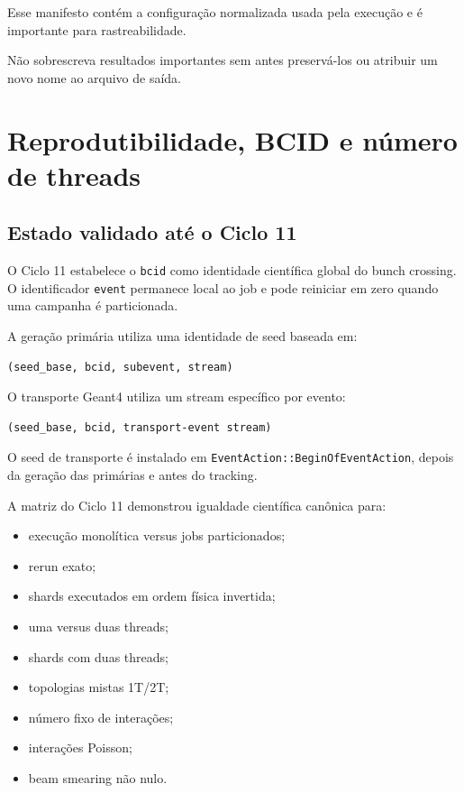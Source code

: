 \documentclass[11pt,a4paper]{article}
\begin{document}
Esse manifesto contém a configuração normalizada usada pela execução e é
importante para rastreabilidade.

Não sobrescreva resultados importantes sem antes preservá-los ou atribuir um
novo nome ao arquivo de saída.

\section{Reprodutibilidade, BCID e número de threads}

\subsection{Estado validado até o Ciclo 11}

O Ciclo 11 estabelece o \texttt{bcid} como identidade científica global do
bunch crossing. O identificador \texttt{event} permanece local ao job e pode
reiniciar em zero quando uma campanha é particionada.

A geração primária utiliza uma identidade de seed baseada em:

\begin{lstlisting}[style=config]
(seed_base, bcid, subevent, stream)
\end{lstlisting}

O transporte Geant4 utiliza um stream específico por evento:

\begin{lstlisting}[style=config]
(seed_base, bcid, transport-event stream)
\end{lstlisting}

O seed de transporte é instalado em
\texttt{EventAction::BeginOfEventAction}, depois da geração das primárias e
antes do tracking.

A matriz do Ciclo 11 demonstrou igualdade científica canônica para:

\begin{itemize}
  \item execução monolítica versus jobs particionados;
  \item rerun exato;
  \item shards executados em ordem física invertida;
  \item uma versus duas threads;
  \item shards com duas threads;
  \item topologias mistas 1T/2T;
  \item número fixo de interações;
  \item interações Poisson;
  \item beam smearing não nulo.
\end{itemize}
\end{document}
